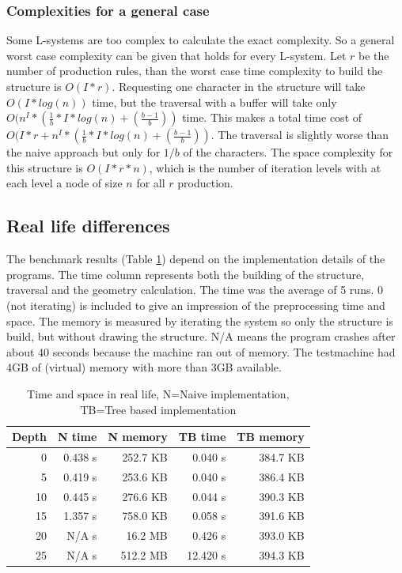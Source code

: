 \documentclass[11pt,a4paper]{article}
\begin{document}
\subsubsection{Complexities for a general case}
Some L-systems are too complex to calculate the exact complexity. So a general worst case complexity can be given that holds for every L-system.
Let $r$ be the number of production rules, than the worst case time complexity to build the structure is $O(I*r)$.
Requesting one character in the structure will take $O(I*log(n))$ time, but the traversal with a buffer will take only $O(n^I * (\frac{1}{b} * I*log(n) + (\frac{b-1}{b}))$ time. This makes a total time cost of $O(I*r + n^I * (\frac{1}{b} * I*log(n) + (\frac{b-1}{b}))$. The traversal is slightly worse than the naive approach but only for $1/b$ of the characters.
The space complexity for this structure is $O(I*r*n)$, which is the number of iteration levels with at each level a node of size $n$ for all $r$ production.

\subsection{Real life differences} %

The benchmark results (Table \ref{bench}) depend on the implementation details of the programs. The time column represents both the building of the structure, traversal and the geometry calculation. The time was the average of 5 runs. 0 (not iterating) is included to give an impression of the preprocessing time and space. The memory is measured by iterating the system so only the structure is build, but without drawing the structure. N/A means the program crashes after about 40 seconds because the machine ran out of memory. The testmachine had 4GB of (virtual) memory with more than 3GB available.

\begin{table}
\center
\begin{tabular}{r r r r r}
Depth & N time & N memory & TB time & TB memory \\ \hline
0  & 0.438 s & 252.7 KB &  0.040 s & 384.7 KB \\ \hline
5  & 0.419 s & 253.6 KB &  0.040 s & 386.4 KB \\ \hline
10 & 0.445 s & 276.6 KB &  0.044 s & 390.3 KB \\ \hline
15 & 1.357 s & 758.0 KB &  0.058 s & 391.6 KB \\ \hline
20 &   N/A s &  16.2 MB &  0.426 s & 393.0 KB \\ \hline
25 &   N/A s & 512.2 MB & 12.420 s & 394.3 KB \\
\end{tabular}
\caption{Time and space in real life, N=Naive implementation, TB=Tree based implementation} \label{bench}
\end{table}
\end{document}
